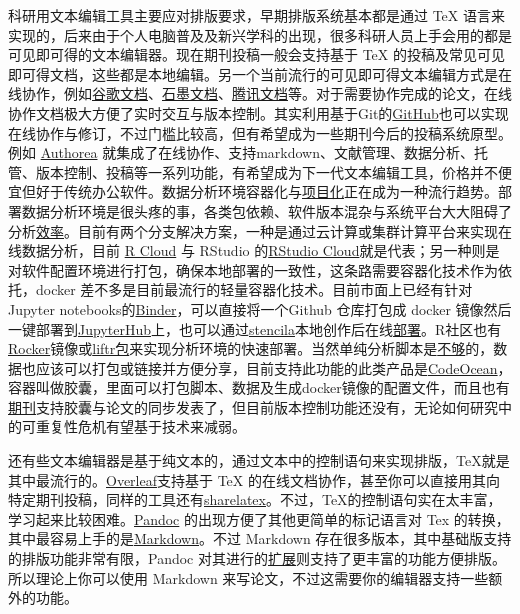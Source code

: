 \documentclass[]{tufte-book}
\begin{document}
科研用文本编辑工具主要应对排版要求，早期排版系统基本都是通过 TeX 语言来实现的，后来由于个人电脑普及及新兴学科的出现，很多科研人员上手会用的都是可见即可得的文本编辑器。现在期刊投稿一般会支持基于 TeX 的投稿及常见可见即可得文档，这些都是本地编辑。另一个当前流行的可见即可得文本编辑方式是在线协作，例如\href{https://docs.google.com/}{谷歌文档}、\href{https://shimo.im/}{石墨文档}、\href{https://docs.qq.com/}{腾讯文档}等。对于需要协作完成的论文，在线协作文档极大方便了实时交互与版本控制。其实利用基于Git的\href{https://github.com/}{GitHub}也可以实现在线协作与修订，不过门槛比较高，但有希望成为一些期刊今后的投稿系统原型。例如 \href{https://www.authorea.com}{Authorea} 就集成了在线协作、支持markdown、文献管理、数据分析、托管、版本控制、投稿等一系列功能，有希望成为下一代文本编辑工具，价格并不便宜但好于传统办公软件。数据分析环境容器化与\href{https://my.scinote.net/projects}{项目化}正在成为一种流行趋势。部署数据分析环境是很头疼的事，各类包依赖、软件版本混杂与系统平台大大阻碍了分析\href{https://www.nature.com/news/1-500-scientists-lift-the-lid-on-reproducibility-1.19970}{效率}。目前有两个分支解决方案，一种是通过云计算或集群计算平台来实现在线数据分析，目前 \href{https://rcloud.social/index.html}{R Cloud} 与 RStudio 的\href{https://rstudio.cloud}{RStudio Cloud}就是代表；另一种则是对软件配置环境进行打包，确保本地部署的一致性，这条路需要容器化技术作为依托，docker 差不多是目前最流行的轻量容器化技术。目前市面上已经有针对Jupyter notebooks的\href{https://mybinder.org/}{Binder}，可以直接将一个Github 仓库打包成 docker 镜像然后一键部署到\href{https://jupyterhub.readthedocs.io/en/latest/index.html}{JupyterHub}上，也可以通过\href{https://stenci.la/}{stencila}本地创作后在线\href{https://github.com/minrk/nbstencilaproxy}{部署}。R社区也有\href{https://www.rocker-project.org/}{Rocker}镜像或\href{https://cran.r-project.org/web/packages/liftr/vignettes/liftr-intro.html}{liftr包}来实现分析环境的快速部署。当然单纯分析脚本是\href{https://markwoodbridge.com/2017/03/05/jupyter-reproducible-science.html}{不够}的，数据也应该可以打包或链接并方便分享，目前支持此功能的此类产品是\href{https://codeocean.com}{CodeOcean}，容器叫做胶囊，里面可以打包脚本、数据及生成docker镜像的配置文件，而且也有\href{https://f1000research.com/articles/4-121/v1}{期刊}支持胶囊与论文的同步发表了，但目前版本控制功能还没有，无论如何研究中的可重复性危机有望基于技术来减弱。

还有些文本编辑器是基于纯文本的，通过文本中的控制语句来实现排版，TeX就是其中最流行的。\href{https://www.overleaf.com/}{Overleaf}支持基于 TeX 的在线文档协作，甚至你可以直接用其向特定期刊投稿，同样的工具还有\href{https://www.sharelatex.com/}{sharelatex}。不过，TeX的控制语句实在太丰富，学习起来比较困难。\href{https://pandoc.org/}{Pandoc} 的出现方便了其他更简单的标记语言对 Tex 的转换，其中最容易上手的是\href{https://daringfireball.net/projects/markdown/}{Markdown}。不过 Markdown 存在很多版本，其中基础版支持的排版功能非常有限，Pandoc 对其进行的\href{https://pandoc.org/MANUAL.html\#pandocs-markdown}{扩展}则支持了更丰富的功能方便排版。所以理论上你可以使用 Markdown 来写论文，不过这需要你的编辑器支持一些额外的功能。
\end{document}
